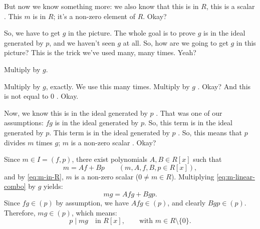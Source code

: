 \begin{proofWrapper}
\begin{speech}[00:35:26 - 00:36:27]
But now we know something more: we also know that this is in $R$, this is a scalar . This $m$ is in $R$; it's a non-zero element of $R$. Okay?

So, we have to get $g$ in the picture. The whole goal is to prove $g$ is in the ideal generated by $p$, and we haven't seen $g$ at all. So, how are we going to get $g$ in this picture? This is the trick we've used many, many times. Yeah?
\end{speech}

\begin{student}
Multiply by $g$.
\end{student}

\begin{speech}[00:36:28 - 00:37:11]
Multiply by $g$, exactly. We use this many times. Multiply by $g$ . Okay? And this is not equal to $0$ . Okay.

Now, we know this is in the ideal generated by $p$ . That was one of our assumptions: $fg$ is in the ideal generated by $p$. So, this term is in the ideal generated by $p$. This term is in the ideal generated by $p$ . So, this means that $p$ divides $m$ times $g$; $m$ is a non-zero scalar . Okay?
\end{speech}

\begin{content}[{Writing $m = Af + Bp$ and Multiplying by $g$}]
Since $m \in I = (f, p)$, there exist polynomials $A, B \in R[x]$ such that
\begin{equation}\label{eq:m-linear-combo}
m = Af + Bp \qquad (m, A, f, B, p \in R[x]),
\end{equation}
and by \eqref{eq:m-in-R}, $m$ is a non-zero scalar ($0 \neq m \in R$). Multiplying \eqref{eq:m-linear-combo} by $g$ yields:
\begin{equation}\label{eq:mg-combo}
mg = Afg + Bgp.
\end{equation}
Since $fg \in (p)$ by assumption, we have $Afg \in (p)$, and clearly $Bgp \in (p)$. Therefore, $mg \in (p)$, which means:
\begin{equation}\label{eq:p-div-mg}
p \mid mg \quad \text{in } R[x], \qquad \text{with } m \in R \setminus \{0\}.
\end{equation}
\end{content}


\end{proofWrapper}

